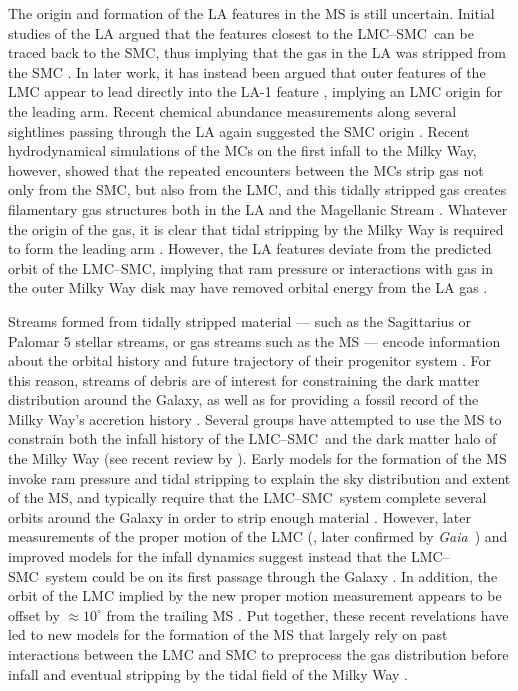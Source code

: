 \documentclass[modern]{aastex62}
\newcommand{\gaia}{\textsl{Gaia}}
\newcommand{\lmcsmc}{LMC--SMC}
\begin{document}
The origin and formation of the LA features in the MS is still uncertain.
Initial studies of the LA argued that the features closest to the \lmcsmc\ can be traced back to the SMC, thus implying that the gas in the LA was stripped from the SMC \citep{Putman:1998}.
In later work, it has instead been argued that outer features of the LMC appear to lead directly into the LA-1 feature \citep{Nidever:2008}, implying an LMC origin for the leading arm.
Recent chemical abundance measurements along several sightlines passing through the LA again suggested the SMC origin \citep{Fox:2018, Richter:2018}.
Recent hydrodynamical simulations of the MCs on the first infall to the Milky Way, however, showed that the repeated encounters between the MCs strip gas not only from the SMC, but also from the LMC, and this tidally stripped gas creates filamentary gas structures both in the LA and the Magellanic Stream \citep{Pardy:2018}.
Whatever the origin of the gas, it is clear that tidal stripping by the Milky Way is required to form the leading arm \citep{Nidever:2008, Besla:2012}.
However, the LA features deviate from the predicted orbit of the \lmcsmc, implying that ram pressure or interactions with gas in the outer Milky Way disk may have removed orbital energy from the LA gas \citep[e.g.,][]{Bekki:2008}.

Streams formed from tidally stripped material --- such as the Sagittarius or Palomar 5 \citep{Odenkirchen:2001} stellar streams, or gas streams such as the MS --- encode information about the orbital history and future trajectory of their progenitor system \citep[e.g.,][]{Johnston:1999}.
For this reason, streams of debris are of interest for constraining the dark matter distribution around the Galaxy, as well as for providing a fossil record of the Milky Way's accretion history \citep{Johnston:1998, Bullock:2005}.
Several groups have attempted to use the MS to constrain both the infall history of the \lmcsmc\ and the dark matter halo of the Milky Way (see recent review by \citealt{DOnghia:2016}).
Early models for the formation of the MS invoke ram pressure and tidal stripping to explain the sky distribution and extent of the MS, and typically require that the \lmcsmc\ system complete several orbits around the Galaxy in order to strip enough material \citep[e.g.,][]{Murai:1980, Gardiner:1994, Mastropietro:2005}.
However, later measurements of the proper motion of the LMC (\citealt{Kallivayalil:2006}, later confirmed by \gaia\ \citealt{van-der-Marel:2016}) and improved models for the infall dynamics \citep{Besla:2007} suggest instead that the \lmcsmc\ system could be on its first passage through the Galaxy \citep{Besla:2010, Besla:2012}.
In addition, the orbit of the LMC implied by the new proper motion measurement appears to be offset by $\approx 10^\circ$ from the trailing MS \citep{Besla:2010}.
Put together, these recent revelations have led to new models for the formation of the MS that largely rely on past interactions between the LMC and SMC to preprocess the gas distribution before infall and eventual stripping by the tidal field of the Milky Way \citep{Besla:2012, Diaz:2012}.
\end{document}
